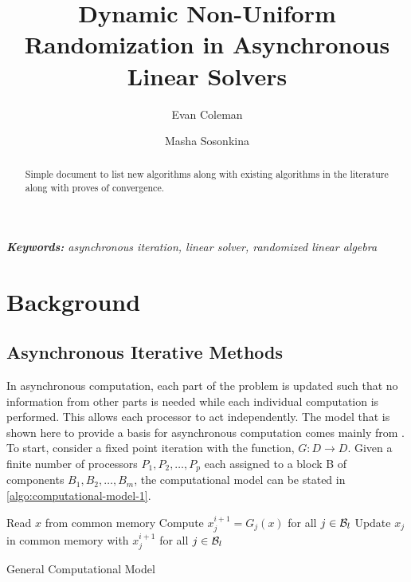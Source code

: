 \documentclass{article}
\title{Dynamic Non-Uniform Randomization in Asynchronous Linear Solvers}
\author{Evan Coleman \and Masha Sosonkina}
\date{}
\theoremstyle{definition}
\theoremstyle{example}
\theoremstyle{example}
\theoremstyle{example}
\begin{document}
	
\maketitle

\begin{abstract}
	Simple document to list new algorithms along with existing algorithms in the literature along with proves of convergence.
\end{abstract}
\noindent
{\em {\bf Keywords:} asynchronous iteration, linear solver, randomized linear algebra}


%
\section{Background}
\label{sec:background}


%
\subsection{Asynchronous Iterative Methods}
\label{sect:asynchronous-iterative-methods}

In asynchronous computation, each part of the problem is updated such that no information from other parts is needed while each individual computation is performed. This allows each processor to act independently. The model that is shown here to provide a basis for asynchronous computation comes mainly from \cite{frommer2000asynchronous}. To start, consider a fixed point iteration with the function, $G: D \rightarrow D$. Given a finite number of processors ${P_1, P_2, \ldots, P_p}$  each assigned to a block {\cal B} of components ${B_1, B_2, \ldots, B_m}$, the computational model can be stated in \cref{algo:computational-model-1}.

\begin{algorithm}
	\DontPrintSemicolon
	 {
		 {
			Read $x$ from common memory \;
			Compute $x_j^{i+1} = G_j(x)$ for all  $j \in {\cal B}_{l}$ \;
			Update $x_j$ in common memory with $x_j^{i+1}$ for all
			$j \in {\cal B}_{l}$ \;
		}
	}
	\caption{General Computational Model}
	\label{algo:computational-model-1}
\end{algorithm}
\end{document}

